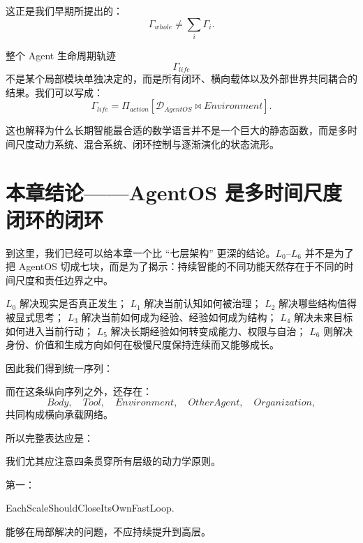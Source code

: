这正是我们早期所提出的：
\[
\boxed{
\Gamma_{whole}
\neq
\sum_i
\Gamma_i.
}
\]

整个 Agent 生命周期轨迹
\[
\Gamma_{life}
\]
不是某个局部模块单独决定的，而是所有闭环、横向载体以及外部世界共同耦合的结果。我们可以写成：
\[
\boxed{
\Gamma_{life}
=
\Pi_{action}
\left[
\mathcal D_{AgentOS}
\bowtie
Environment
\right].
}
\]

这也解释为什么长期智能最合适的数学语言并不是一个巨大的静态函数，而是多时间尺度动力系统、混合系统、闭环控制与逐渐演化的状态流形。

\section{本章结论——AgentOS 是多时间尺度闭环的闭环}

到这里，我们已经可以给本章一个比 ``七层架构'' 更深的结论。$L_0$--$L_6$ 并不是为了把 AgentOS 切成七块，而是为了揭示：持续智能的不同功能天然存在于不同的时间尺度和责任边界之中。

$L_0$ 解决现实是否真正发生；
$L_1$ 解决当前认知如何被治理；
$L_2$ 解决哪些结构值得被显式思考；
$L_3$ 解决当前如何成为经验、经验如何成为结构；
$L_4$ 解决未来目标如何进入当前行动；
$L_5$ 解决长期经验如何转变成能力、权限与自治；
$L_6$ 则解决身份、价值和生成方向如何在极慢尺度保持连续而又能够成长。

因此我们得到统一序列：
\begin{statementbox}
\centering
{}
\end{statementbox}

而在这条纵向序列之外，还存在：
\[
Body,
\quad
Tool,
\quad
Environment,
\quad
OtherAgent,
\quad
Organization,
\]
共同构成横向承载网络。

所以完整表达应是：
\begin{statementbox}
\centering
{}
\end{statementbox}

我们尤其应注意四条贯穿所有层级的动力学原则。

第一：
\begin{statementbox}
EachScaleShouldCloseItsOwnFastLoop.
\end{statementbox}
能够在局部解决的问题，不应持续提升到高层。

